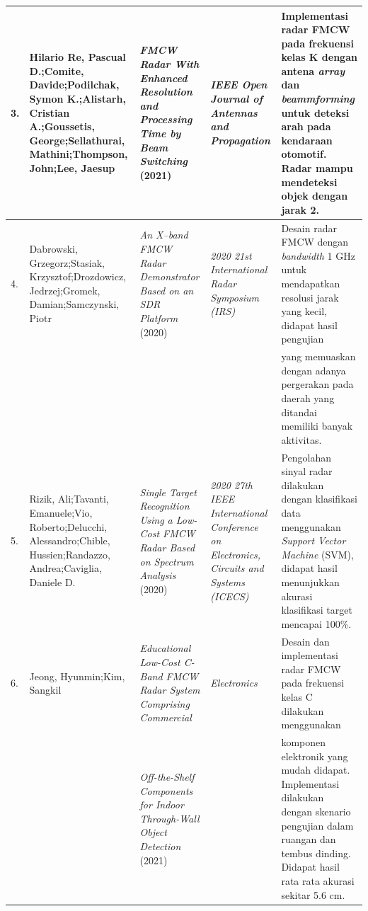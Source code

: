 \begin{center}
\begin{longtable}{|p{0.5cm}|p{2cm}|p{3cm}|p{2.5cm}|p{3cm}|}
	3. & Hilario Re, Pascual D.;\newline Comite, Davide;\newline Podilchak, Symon K.;\newline Alistarh, Cristian A.;\newline Goussetis, George;\newline Sellathurai, Mathini;\newline Thompson, John;\newline Lee, Jaesup
	& \textit{FMCW Radar With Enhanced Resolution and Processing Time by Beam Switching} (2021) \cite{HilarioRe2021}
	& \textit{IEEE Open Journal of Antennas and Propagation}
	& Implementasi radar FMCW pada frekuensi kelas K dengan antena \textit{array} dan \textit{beammforming} untuk deteksi arah pada kendaraan otomotif. Radar mampu mendeteksi objek dengan jarak 2\textdegree.
	\\ \hline
	4.& Dabrowski, Grzegorz;\newline Stasiak, Krzysztof;\newline Drozdowicz, Jedrzej;\newline Gromek, Damian;\newline Samczynski, Piotr
	& \textit{An X–band FMCW Radar Demonstrator Based on an SDR Platform} (2020) \cite{Dabrowski2020}
	& \textit{2020 21st International Radar Symposium (IRS)}
	& Desain radar FMCW dengan \textit{bandwidth} 1 GHz untuk mendapatkan resolusi jarak yang kecil, didapat hasil pengujian \\
	&
	&
	&
	& yang memuaskan dengan adanya pergerakan pada daerah yang ditandai memiliki banyak aktivitas. \\ \hline
	
	5.& Rizik, Ali;\newline Tavanti, Emanuele;\newline Vio, Roberto;\newline Delucchi, Alessandro;\newline Chible, Hussien;\newline Randazzo, Andrea;\newline Caviglia, Daniele D.
	& \textit{Single Target Recognition Using a Low-Cost FMCW Radar Based on Spectrum Analysis} (2020) \cite{Rizik2020}
	& \textit{2020 27th IEEE International Conference on Electronics, Circuits and Systems (ICECS)}
	& Pengolahan sinyal radar dilakukan dengan klasifikasi data menggunakan \textit{Support Vector Machine} (SVM), didapat hasil menunjukkan akurasi klasifikasi target mencapai 100\%. 
	\\ \hline
	6. & Jeong, Hyunmin;\newline Kim, Sangkil
	& \textit{Educational Low-Cost C-Band FMCW Radar System Comprising Commercial} 
	& \textit{Electronics}
	& Desain dan implementasi radar FMCW pada frekuensi kelas C dilakukan menggunakan \\
	&
	&\textit{ Off-the-Shelf Components for Indoor Through-Wall Object Detection} (2021) \cite{Jeong2021}
	& 
	& komponen elektronik yang mudah didapat. Implementasi dilakukan dengan skenario pengujian dalam ruangan dan tembus dinding. Didapat hasil rata rata akurasi sekitar 5.6 cm. \\ \hline
	

\end{longtable}
\end{center}
